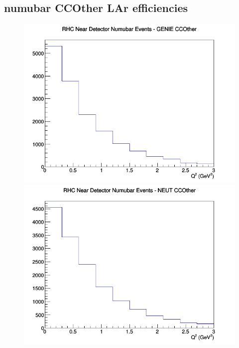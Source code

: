 \subsection{numubar CCOther LAr efficiencies}
\begin{figure}[h]
\includegraphics[width=\linewidth]{eff_Q2/LAr/CCOther_RHC_ND_numubar_Q2_GENIE.png}
\endminipage
{}
\includegraphics[width=\linewidth]{eff_Q2/LAr/CCOther_RHC_ND_numubar_Q2_NEUT.png}
\endminipage
{}

\end{figure}
